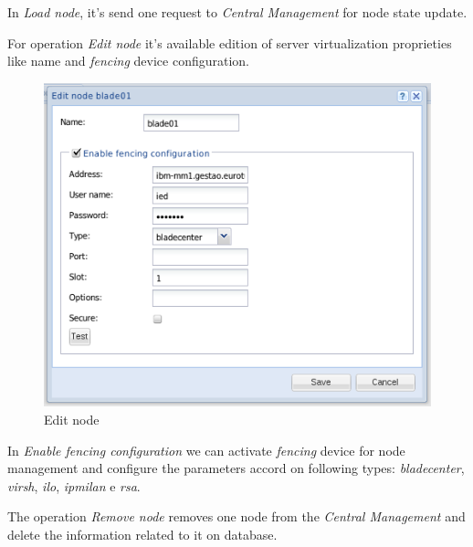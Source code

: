 In \emph{Load node}, it's send one request to \emph{Central Management} for node state update.

For operation \emph{Edit node} it's available edition of server virtualization proprieties like name and \emph{fencing} device configuration.
\begin{figure}[H]
       \begin{center}
       \includegraphics[scale=0.5]{screenshots/node_edit.png}
       \caption{Edit node}
       \label{fig:node_edit}
       \end{center}
\end{figure}
\label{para:node_fencing_config}In \emph{Enable \emph{fencing} configuration} we can activate \emph{fencing} device for node management and configure the parameters accord on following types: \emph{bladecenter}, \emph{virsh}, \emph{ilo}, \emph{ipmilan} e \emph{rsa}.

The operation \emph{Remove node} removes one node from the \emph{Central Management} and delete the information related to it on database.

